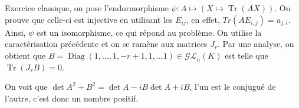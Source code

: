 \documentclass{article}
\DeclareMathOperator{\Tr}{Tr}
\DeclareMathOperator{\diag}{Diag}
\begin{document}
	Exercice classique, on pose l'endormorphisme $\psi : A \mapsto (X\mapsto \Tr(AX))$. On prouve que celle-ci est injective en utilisant les $E_{ij}$, en effet, $Tr(AE_{i,j}) = a_{j,i}$. Ainsi, $\psi$ est un isomorphisme, ce qui répond au problème. On utilise la caractérisation précédente et on se ramène aux matrices $J_r$. Par une analyse, on obtient que $B = \diag(1, \ldots, 1, -r+1, 1, \ldots 1)\in\mathcal{GL}_n(K)$ est telle que $\Tr(J_rB) = 0$. 

	On voit que $\det A^2 + B^2 = \det A-iB \det A+iB$, l'un est le conjugué de l'autre, c'est donc un nombre positif.
	
\end{document}
